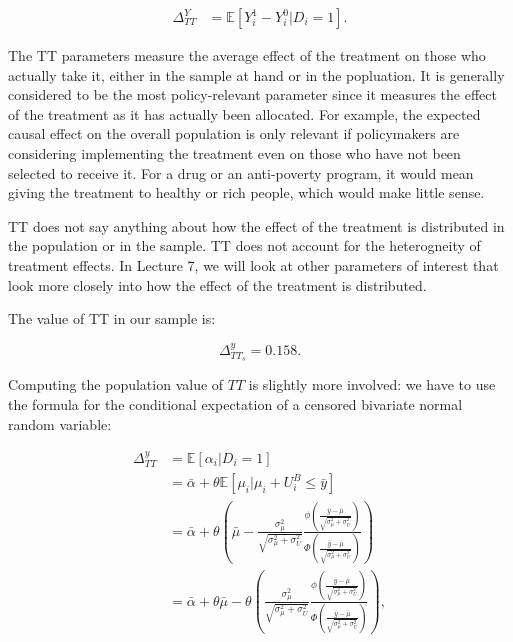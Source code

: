\documentclass[]{book}
\newcommand{\esp}[1]{\mathbb{E}[ #1 ]}
\theoremstyle{definition}
\theoremstyle{definition}
\theoremstyle{definition}
\theoremstyle{remark}
\let\BeginKnitrBlock\begin \let\EndKnitrBlock\end
\begin{document}
\begin{align*}
  \Delta^Y_{TT} & = \esp{Y_i^1-Y_i^0|D_i=1}.
  \end{align*}

The TT parameters measure the average effect of the treatment on those
who actually take it, either in the sample at hand or in the popluation.
It is generally considered to be the most policy-relevant parameter
since it measures the effect of the treatment as it has actually been
allocated. For example, the expected causal effect on the overall
population is only relevant if policymakers are considering implementing
the treatment even on those who have not been selected to receive it.
For a drug or an anti-poverty program, it would mean giving the
treatment to healthy or rich people, which would make little sense.

TT does not say anything about how the effect of the treatment is
distributed in the population or in the sample. TT does not account for
the heterogneity of treatment effects. In Lecture 7, we will look at
other parameters of interest that look more closely into how the effect
of the treatment is distributed.

\BeginKnitrBlock{example}
\protect\hypertarget{exm:unnamed-chunk-9}{}{\label{exm:unnamed-chunk-9} }The
value of TT in our sample is:
\EndKnitrBlock{example} \[
\Delta^y_{TT_s}=0.158.
\]

Computing the population value of \(TT\) is slightly more involved: we
have to use the formula for the conditional expectation of a censored
bivariate normal random variable:

\begin{align*}
\Delta^y_{TT} & = \esp{\alpha_i|D_i=1}\\
              & = \bar{\alpha}+\theta\esp{\mu_i|\mu_i+U_i^B\leq\bar{y}}\\
              & = \bar{\alpha}+\theta\left(\bar{\mu} - \frac{\sigma^2_{\mu}}{\sqrt{\sigma^2_{\mu}+\sigma^2_{U}}}\frac{\phi\left(\frac{\bar{y}-\bar{\mu}}{\sqrt{\sigma^2_{\mu}+\sigma^2_{U}}}\right)}{\Phi\left(\frac{\bar{y}-\bar{\mu}}{\sqrt{\sigma^2_{\mu}+\sigma^2_{U}}}\right)}\right)\\
              & = \bar{\alpha}+\theta\bar{\mu}-\theta\left(\frac{\sigma^2_{\mu}}{\sqrt{\sigma^2_{\mu}+\sigma^2_{U}}}\frac{\phi\left(\frac{\bar{y}-\bar{\mu}}{\sqrt{\sigma^2_{\mu}+\sigma^2_{U}}}\right)}{\Phi\left(\frac{\bar{y}-\bar{\mu}}{\sqrt{\sigma^2_{\mu}+\sigma^2_{U}}}\right)}\right),
\end{align*}
\end{document}
